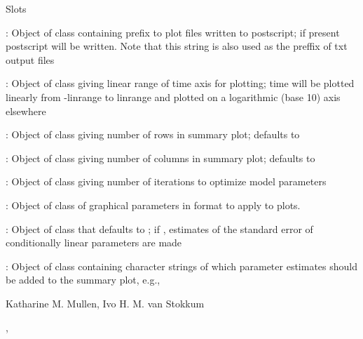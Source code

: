\documentclass{article}
\begin{document}
\begin{Section}{Slots}
{\item[\code{makeps}:] Object of class  containing 
prefix to plot files written to postscript; 
if present postscript will be written. Note that this string is also 
used as the preffix of txt output files 
\item[\code{linrange}:] Object of class  giving linear
range of time axis for plotting; time will be plotted linearly from
-linrange to linrange and plotted on a logarithmic (base 10) axis elsewhere
\item[\code{summaryplotrow}:] Object of class  giving  
number of rows in summary plot; defaults to 
\item[\code{summaryplotcol}:] Object of class  giving  
number of columns in summary plot; defaults to 
\item[\code{iter}:] Object of class  giving  number of iterations to optimize model parameters
\item[\code{paropt}:] Object of class  
of graphical parameters in format  
to apply to plots. 
\item[\code{stderrclp}:] Object of class  that defaults 
to ; if , estimates of the standard error of 
conditionally linear parameters are made
\item[\code{addest}:] Object of class  containing 
character strings of which parameter estimates should be added to the 
summary plot, e.g.,   
}
\end{Section}
\begin{Author}\relax
Katharine M. Mullen, Ivo H. M. van Stokkum
\end{Author}
\begin{SeeAlso}\relax
{}, 
\end{SeeAlso}
\end{document}
